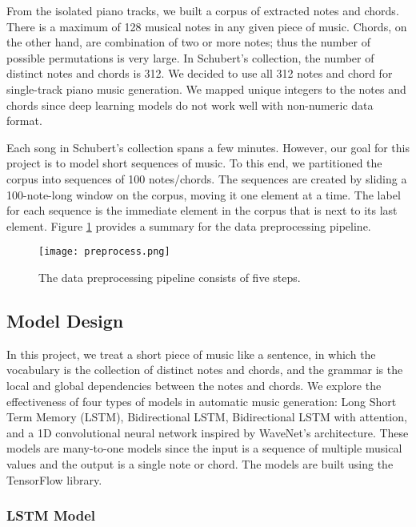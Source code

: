 \documentclass[sigconf,authorversion]{acmart}
\begin{document}
From the isolated piano tracks, we built a corpus of extracted notes and chords. 
There is a maximum of 128 musical notes in any given piece of music. Chords, on the 
other hand, are combination of two or more notes; thus the number of possible permutations 
is very large. In Schubert's collection, the number of distinct notes and chords is 312. 
We decided to use all 312 notes and chord for single-track
piano music generation. We mapped unique integers to the notes and chords since deep 
learning models do not work well with non-numeric data format.

Each song in Schubert's collection spans a few minutes. However, our goal for this 
project is to model short sequences of music. To this end, we partitioned the corpus
into sequences of 100 notes/chords. The sequences are created by sliding a 100-note-long
window on the corpus, moving it one element at a time. The label for each sequence is 
the immediate element in the corpus that is next to its last element. 
Figure \ref{preprocessing} provides a summary for the data preprocessing pipeline.

\begin{figure}[h]
  \centering
  \texttt{[image: preprocess.png]}
  \caption{The data preprocessing pipeline consists of five steps.}
  \label{preprocessing}
\end{figure}

\subsection{Model Design}

In this project, we treat a short piece of music like 
a sentence, in which the vocabulary is the collection of distinct notes 
and chords, and the grammar is the local and global dependencies between
the notes and chords. We explore the effectiveness of four types of models 
in automatic music generation: Long Short Term Memory (LSTM), Bidirectional
LSTM, Bidirectional LSTM with attention, and a 1D convolutional neural 
network inspired by WaveNet's architecture. These models are many-to-one
models since the input is a sequence of multiple musical values and the output 
is a single note or chord. The models are built using the TensorFlow library.

\subsubsection{LSTM Model}
\end{document}
